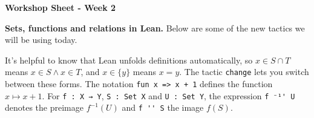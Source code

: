 \documentclass[a4paper]{article}
\begin{document}
\begin{center}
\large\bfseries Workshop Sheet - Week 2
\end{center}

\noindent\textbf{Sets, functions and relations in Lean.}
Below are some of the new tactics we will be using today.
\smallskip

\par
\smallskip
\par\noindent It's helpful to know that Lean unfolds definitions automatically, so $x\in S\cap T$ means $x\in S\land x\in T$, and $x\in\{y\}$ means $x=y$. The tactic \verb|change| lets you switch between these forms. The notation \verb|fun x => x + 1| defines the function $x\mapsto x+1$. For \verb|f : X → Y|, \verb|S : Set X| and \verb|U : Set Y|, the expression \verb|f ⁻¹' U| denotes the preimage $f^{-1}(U)$ and \verb|f '' S| the image $f(S)$.
\end{document}
